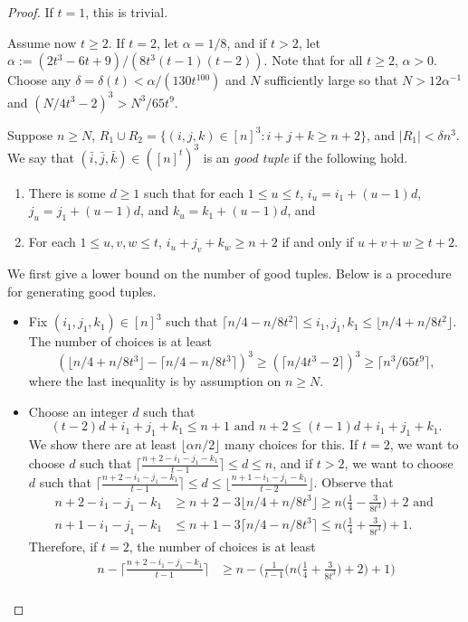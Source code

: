 \documentclass[12pt,oneside,british,a4wide]{amsart}
\numberwithin{equation}{section}
\theoremstyle{definition}
\newcommand{\ibar}{\bar{i}}
\newcommand{\jbar}{\bar{j}}
\newcommand{\kbar}{\bar{k}}
\begin{document}
\begin{proof}
If $t=1$, this is trivial. 

Assume now $t\geq 2$.  If $t=2$, let $\alpha=1/8$, and if $t>2$, let $\alpha:=(2t^3-6t+9)/(8t^3(t-1)(t-2))$.  Note that for all $t\geq 2$, $\alpha>0$. Choose any $\delta=\delta(t)<\alpha/(130 t^{100})$ and $N$ sufficiently large so that $N>12\alpha^{-1}$ and $(N/4t^3-2)^3>N^3/65 t^9$.

Suppose $n\geq N$, $R_1\cup R_2=\{(i,j,k)\in [n]^3: i+j+k\geq n+2\}$, and $|R_1|<\delta n^3$.  We say that $(\ibar,\jbar,\kbar)\in ([n]^t)^3$ is an \emph{good tuple} if the following hold.
\begin{enumerate}
\item There is some $d\geq 1$ such that for each $1\leq u\leq t$, $i_u=i_1+(u-1)d$, $j_u=j_1+(u-1)d$, and $k_u=k_1+(u-1)d$, and 
\item For each $1\leq u,v,w\leq t$, $i_u+j_v+k_w\geq n+2$ if and only if $u+v+w\geq t+2$.  
\end{enumerate}
We first give a lower bound on the number of good tuples.  Below is a procedure for generating good tuples.
\begin{itemize}
\item Fix $(i_1,j_1,k_1)\in [n]^3$ such that $\lceil n/4-n/8t^2\rceil \leq i_1,j_1,k_1\leq \lfloor n/4+n/8t^2\rfloor $.   The number of choices is at least 
$$
(\lfloor n/4+n/8t^3\rfloor -\lceil n/4-n/8t^3\rceil)^3 \geq (\lceil n/4t^3-2\rceil )^3\geq \lceil n^3/65t^9\rceil, 
$$
where the last inequality is by assumption on $n\geq N$.
\item Choose an integer $d$ such that 
$$
(t-2)d+i_1+j_1+k_1 \leq n+1 \text{ and } n+2\leq (t-1)d+i_1+j_1+k_1.
$$
We show there are at least $\lfloor \alpha n/2\rfloor $ many choices for this.  If $t=2$, we want to choose $d$ such that $\lceil \frac{n+2-i_1-j_1-k_1}{t-1}\rceil\leq d\leq n$, and if $t>2$, we want to choose $d$ such that $\lceil \frac{n+2-i_1-j_1-k_1}{t-1}\rceil\leq d\leq \lfloor \frac{n+1-i_1-j_1-k_1}{t-2}\rfloor$.  Observe that 
\begin{align*}
n+2-i_1-j_1-k_1&\geq n+2-3\lfloor n/4+n/8t^3\rfloor\geq n\Big(\frac{1}{4} -\frac{3}{8t^3}\Big)+2\text{ and }\\
n+1-i_1-j_1-k_1&\leq n+1-3\lceil n/4-n/8t^3\rceil\leq n\Big(\frac{1}{4} +\frac{3}{8t^3}\Big)+1.
\end{align*}
Therefore, if $t=2$, the number of choices is at least
\begin{align*}
n- \Big\lceil \frac{n+2-i_1-j_1-k_1}{t-1}\Big\rceil&\geq n- \Big(\frac{1}{t-1}\Big(n\Big(\frac{1}{4} +\frac{3}{8t^3}\Big)+2\Big)+1\Big)\\

\end{align*}
\end{itemize}
\end{proof}
\end{document}
